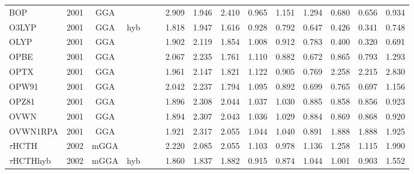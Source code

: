 \begin{landscape}
\begin{longtable}{lc:cccc:rrr:rrr:rrr}
    BOP              & 2001 & GGA  &          &             &           & 2.909             & 1.946             & 2.410  & 0.965              & 1.151             & 1.294  & 0.680   & 0.656 & 0.934 \\
    O3LYP            & 2001 & GGA  & hyb      &             &           & 1.818             & 1.947             & 1.616  & 0.928              & 0.792             & 0.647  & 0.426   & 0.341 & 0.748 \\
    OLYP             & 2001 & GGA  &          &             &           & 1.902             & 2.119             & 1.854  & 1.008              & 0.912             & 0.783  & 0.400   & 0.320 & 0.691 \\
    OPBE             & 2001 & GGA  &          &             &           & 2.067             & 2.235             & 1.761  & 1.110              & 0.882             & 0.672  & 0.865   & 0.793 & 1.293 \\
    OPTX             & 2001 & GGA  &          &             &           & 1.961             & 2.147             & 1.821  & 1.122              & 0.905             & 0.769  & 2.258   & 2.215 & 2.830 \\
    OPW91            & 2001 & GGA  &          &             &           & 2.042             & 2.237             & 1.794  & 1.095              & 0.892             & 0.699  & 0.765   & 0.697 & 1.156 \\
    OPZ81            & 2001 & GGA  &          &             &           & 1.896             & 2.308             & 2.044  & 1.037              & 1.030             & 0.885  & 0.858   & 0.856 & 0.923 \\
    OVWN             & 2001 & GGA  &          &             &           & 1.894             & 2.307             & 2.043  & 1.036              & 1.029             & 0.884  & 0.869   & 0.868 & 0.920 \\
    OVWN1RPA         & 2001 & GGA  &          &             &           & 1.921             & 2.317             & 2.055  & 1.044              & 1.040             & 0.891  & 1.888   & 1.888 & 1.925 \\
    $\tau$HCTH            & 2002 & mGGA &          &             &           & 2.220             & 2.085             & 2.055  & 1.103              & 0.978             & 1.136  & 1.258   & 1.115 & 1.990 \\
    $\tau$HCTHhyb         & 2002 & mGGA & hyb      &             &           & 1.860             & 1.837             & 1.882  & 0.915              & 0.874             & 1.044  & 1.001   & 0.903 & 1.552 \\

\end{longtable}
\end{landscape}
